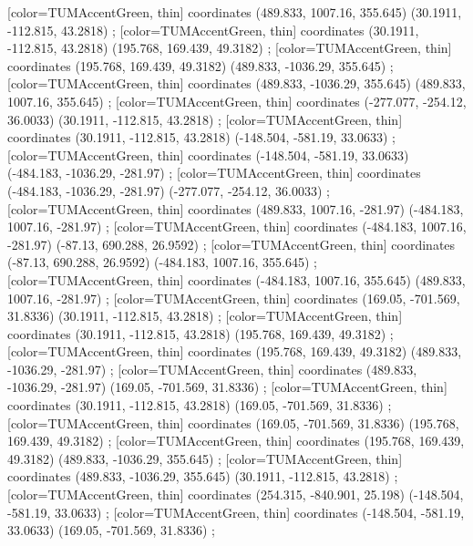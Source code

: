         [color=TUMAccentGreen, thin] coordinates { (489.833, 1007.16, 355.645) (30.1911, -112.815, 43.2818) };
        [color=TUMAccentGreen, thin] coordinates { (30.1911, -112.815, 43.2818) (195.768, 169.439, 49.3182) };
        [color=TUMAccentGreen, thin] coordinates { (195.768, 169.439, 49.3182) (489.833, -1036.29, 355.645) };
        [color=TUMAccentGreen, thin] coordinates { (489.833, -1036.29, 355.645) (489.833, 1007.16, 355.645) };
        [color=TUMAccentGreen, thin] coordinates { (-277.077, -254.12, 36.0033) (30.1911, -112.815, 43.2818) };
        [color=TUMAccentGreen, thin] coordinates { (30.1911, -112.815, 43.2818) (-148.504, -581.19, 33.0633) };
        [color=TUMAccentGreen, thin] coordinates { (-148.504, -581.19, 33.0633) (-484.183, -1036.29, -281.97) };
        [color=TUMAccentGreen, thin] coordinates { (-484.183, -1036.29, -281.97) (-277.077, -254.12, 36.0033) };
        [color=TUMAccentGreen, thin] coordinates { (489.833, 1007.16, -281.97) (-484.183, 1007.16, -281.97) };
        [color=TUMAccentGreen, thin] coordinates { (-484.183, 1007.16, -281.97) (-87.13, 690.288, 26.9592) };
        [color=TUMAccentGreen, thin] coordinates { (-87.13, 690.288, 26.9592) (-484.183, 1007.16, 355.645) };
        [color=TUMAccentGreen, thin] coordinates { (-484.183, 1007.16, 355.645) (489.833, 1007.16, -281.97) };
        [color=TUMAccentGreen, thin] coordinates { (169.05, -701.569, 31.8336) (30.1911, -112.815, 43.2818) };
        [color=TUMAccentGreen, thin] coordinates { (30.1911, -112.815, 43.2818) (195.768, 169.439, 49.3182) };
        [color=TUMAccentGreen, thin] coordinates { (195.768, 169.439, 49.3182) (489.833, -1036.29, -281.97) };
        [color=TUMAccentGreen, thin] coordinates { (489.833, -1036.29, -281.97) (169.05, -701.569, 31.8336) };
        [color=TUMAccentGreen, thin] coordinates { (30.1911, -112.815, 43.2818) (169.05, -701.569, 31.8336) };
        [color=TUMAccentGreen, thin] coordinates { (169.05, -701.569, 31.8336) (195.768, 169.439, 49.3182) };
        [color=TUMAccentGreen, thin] coordinates { (195.768, 169.439, 49.3182) (489.833, -1036.29, 355.645) };
        [color=TUMAccentGreen, thin] coordinates { (489.833, -1036.29, 355.645) (30.1911, -112.815, 43.2818) };
        [color=TUMAccentGreen, thin] coordinates { (254.315, -840.901, 25.198) (-148.504, -581.19, 33.0633) };
        [color=TUMAccentGreen, thin] coordinates { (-148.504, -581.19, 33.0633) (169.05, -701.569, 31.8336) };
